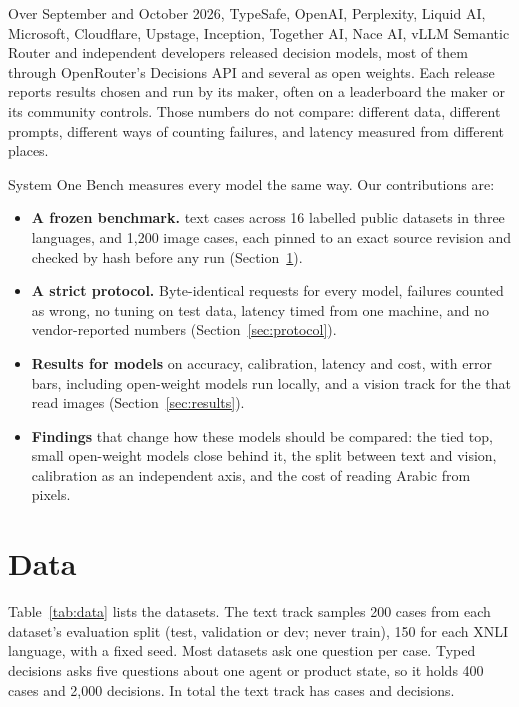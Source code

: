 \documentclass[11pt]{article}
\begin{document}
Over September and October 2026, TypeSafe, OpenAI, Perplexity, Liquid AI, Microsoft, Cloudflare, Upstage, Inception,
Together AI, Nace AI, vLLM Semantic Router and independent developers released decision models, most of them through
OpenRouter's Decisions API and several as open weights. Each release reports results chosen and run by its maker, often on a leaderboard the maker or its
community controls. Those numbers do not compare: different data, different prompts, different ways of counting
failures, and latency measured from different places.

System One Bench measures every model the same way. Our contributions are:
\begin{itemize}
  \item \textbf{A frozen benchmark.} \nCases{} text cases across 16 labelled public datasets in three languages,
  and 1{,}200 image cases, each pinned to an exact source revision and checked by hash before any run
  (Section~\ref{sec:data}).
  \item \textbf{A strict protocol.} Byte-identical requests for every model, failures counted as wrong, no tuning on
  test data, latency timed from one machine, and no vendor-reported numbers (Section~\ref{sec:protocol}).
  \item \textbf{Results for \nModels{} models} on accuracy, calibration, latency and cost, with error bars,
  including \nLocal{} open-weight models run locally, and a vision track for the \nVision{} that read images (Section~\ref{sec:results}).
  \item \textbf{Findings} that change how these models should be compared: the tied top, small open-weight models close
  behind it, the split between text and vision, calibration as an independent axis, and the cost of reading Arabic from pixels.
\end{itemize}

\section{Data}\label{sec:data}

Table~\ref{tab:data} lists the datasets. The text track samples 200 cases from each dataset's evaluation split (test, validation or
dev; never train), 150 for each XNLI language, with a fixed seed. Most datasets ask one question per case. Typed decisions
\citep{typeddecisions} asks five questions about one agent or product state, so it holds 400 cases and 2{,}000
decisions. In total the text track has \nCases{} cases and \nDecisions{} decisions.
\end{document}
